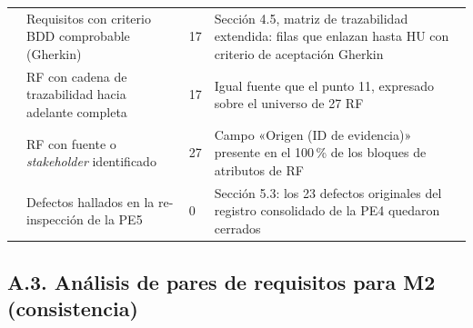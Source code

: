 \documentclass[journal,onecolumn]{IEEEtran}
\begin{document}
\begin{longtable}{C{0.7cm} L{4.3cm} C{1.3cm} L{7.5cm}}
		 & Requisitos con criterio BDD comprobable (Gherkin) & 17 & Sección 4.5, matriz de trazabilidad extendida: filas que enlazan hasta HU con criterio de aceptación Gherkin \\
		 & RF con cadena de trazabilidad hacia adelante completa & 17 & Igual fuente que el punto 11, expresado sobre el universo de 27 RF \\
		 & RF con fuente o \textit{stakeholder} identificado & 27 & Campo «Origen (ID de evidencia)» presente en el 100\,\% de los bloques de atributos de RF \\
		 & Defectos hallados en la re-inspección de la PE5 & 0 & Sección 5.3: los 23 defectos originales del registro consolidado de la PE4 quedaron cerrados \\
	\end{longtable}
	
	\subsection*{A.3. Análisis de pares de requisitos para M2 (consistencia)}
	
\end{document}
